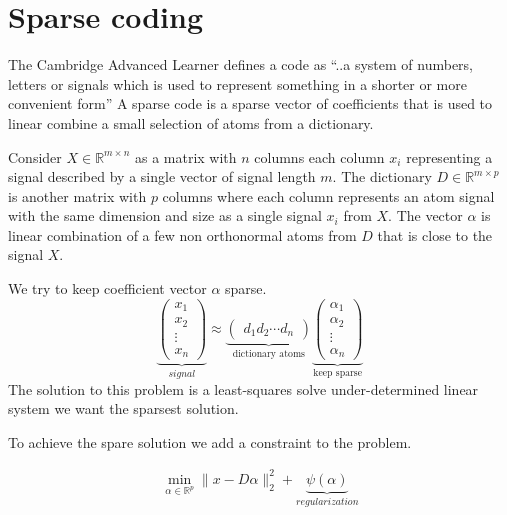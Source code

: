 \chapter{Sparse coding}
\thispagestyle{empty}

The Cambridge Advanced Learner defines a code as ``..a system of numbers, letters or signals which is used to represent something in a shorter or more convenient form''
A sparse code is a sparse vector of coefficients that is used to linear combine a small selection of atoms from a dictionary.


Consider $X \in \mathbb{R}^{m\times n}$  as a matrix with $n$ columns each column $x_{i}$ representing a signal described by a single vector of signal length $m$.
The dictionary $D\in\mathbb{R}^{m \times p}$ is another matrix with $p$ columns where each column represents an atom signal with the same dimension and size as a single signal $x_{i}$ from $X$.
The vector $\alpha$ is linear combination of a few non orthonormal atoms from $D$ that is close to the signal $X$.

We try to keep coefficient vector $\alpha$ sparse. 
\[
\underbrace{\begin{pmatrix} x_1 \\ x_2 \\ \vdots \\ x_n \end{pmatrix}}_{signal} \approx \underbrace{\begin{pmatrix} d_1  d_2 \cdots d_n \end{pmatrix}}_{\textrm{dictionary atoms}}
\underbrace{\begin{pmatrix} \alpha_1 \\ \alpha_2 \\ \vdots \\ \alpha_n \end{pmatrix}}_{\textrm{keep sparse}}
\]
The solution to this problem is a least-squares solve under-determined linear system we want the sparsest solution.

To achieve the spare solution we add a constraint to the problem. 

\begin{align}
\min_{\alpha\in\mathbb{R}^{p}} \lVert x - D\alpha \rVert^{2}_{2} + \underbrace{\psi(\alpha)}_{regularization}
\end{align}


